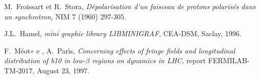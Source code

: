 \begin{thebibliography}{99}
M.~Froissart et R.~Stora, 
\textsl{D\'epolarisation d'un faisceau de protons polaris\'es dans un synchrotron},
 NIM 7 (1960) 297-305.

J.L.~Hamel, 
\textsl{mini graphic library LIBMINIGRAF}, 
CEA-DSM, Saclay, 1996.

F.~M\'eot∗ e , A.~Par\'{\i}s, 
\textsl{Concerning effects of fringe fields and longitudinal distribution of b10 in
low-$\beta$ regions on dynamics in LHC, } 
report FERMILAB-TM-2017, August 23, 1997. 

\end{thebibliography}



